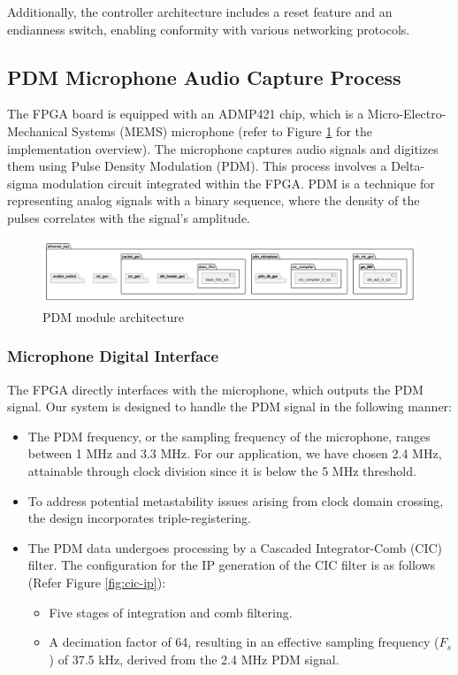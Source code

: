 Additionally, the controller architecture includes a reset feature and an endianness switch, enabling conformity with various networking protocols.



\subsection{PDM Microphone Audio Capture Process}

The FPGA board is equipped with an ADMP421 chip, which is a Micro-Electro-Mechanical Systems (MEMS) microphone (refer to Figure \ref{fig:pdm-mod-arch} for the implementation overview). The microphone captures audio signals and digitizes them using Pulse Density Modulation (PDM). This process involves a Delta-sigma modulation circuit integrated within the FPGA. PDM is a technique for representing analog signals with a binary sequence, where the density of the pulses correlates with the signal's amplitude.

\begin{figure}
    \centering
    \includegraphics[width=1\linewidth]{Sections//IMPLEMENTATION//images/ModulePDM.png}
    \caption{PDM module architecture}
    \label{fig:pdm-mod-arch}
\end{figure}

\subsubsection{Microphone Digital Interface}
The FPGA directly interfaces with the microphone, which outputs the PDM signal. Our system is designed to handle the PDM signal in the following manner:

\begin{itemize}
    \item The PDM frequency, or the sampling frequency of the microphone, ranges between 1 MHz and 3.3 MHz. For our application, we have chosen 2.4 MHz, attainable through clock division since it is below the 5 MHz threshold.
    \item To address potential metastability issues arising from clock domain crossing, the design incorporates triple-registering.
    \item The PDM data undergoes processing by a Cascaded Integrator-Comb (CIC) filter. The configuration for the IP generation of the CIC filter is as follows (Refer Figure \ref{fig:cic-ip}):
    \begin{itemize}
        \item Five stages of integration and comb filtering.
        \item A decimation factor of 64, resulting in an effective sampling frequency ($F_s$) of 37.5 kHz, derived from the 2.4 MHz PDM signal.
    \end{itemize}
\end{itemize}

